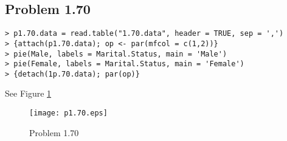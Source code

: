 \documentclass{article}
\begin{document}
\subsection{Problem 1.70}
\begin{verbatim}
> p1.70.data = read.table("1.70.data", header = TRUE, sep = ',')
> {attach(p1.70.data); op <- par(mfcol = c(1,2))}
> pie(Male, labels = Marital.Status, main = 'Male')
> pie(Female, labels = Marital.Status, main = 'Female')
> {detach(1p.70.data); par(op)}
\end{verbatim}
	See Figure \ref{p1.70}
	\begin{figure}[!htb]
	  \centering
	  \texttt{[image: p1.70.eps]}
	  \caption{Problem 1.70 \label{p1.70}}
	\end{figure}

\clearpage
\end{document}
